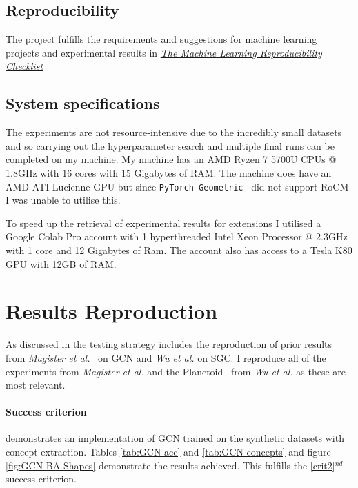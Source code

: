 \subsection{Reproducibility}
The project fulfills the requirements and suggestions for machine learning projects and experimental results in \href{https://www.cs.mcgill.ca/~jpineau/ReproducibilityChecklist-v2.0.pdf}{\textit{The Machine Learning Reproducibility Checklist}}~\cite{pineau2021improving} 

\subsection{System specifications}
The experiments are not resource-intensive due to the incredibly small datasets and so carrying out the hyperparameter search and multiple final runs can be completed on my machine.
My machine has an AMD Ryzen 7 5700U CPUs @ 1.8GHz with 16 cores with 15 Gigabytes of RAM.
The machine does have an AMD ATI Lucienne GPU but since \texttt{PyTorch Geometric}~\cite{paszke2019pytorch} did not support RoCM I was unable to utilise this.

To speed up the retrieval of experimental results for extensions I utilised a Google Colab Pro account with 1 hyperthreaded Intel Xeon Processor @ 2.3GHz with 1 core and 12 Gigabytes of Ram.
The account also has access to a Tesla K80 GPU with 12GB of RAM.

\section{Results Reproduction}
\label{sec:reproduction}

As discussed in  the testing strategy includes the reproduction of prior results from \textit{Magister et al.}~\cite{magister2021gcexplainer} on GCN and \textit{Wu et al.}\cite{wu2019simplifying} on SGC.
I reproduce all of the experiments from \textit{Magister et al.} and the Planetoid~\cite{kipf2016semi} from \textit{Wu et al.} as these are most relevant.

\paragraph{Success criterion}
 demonstrates an implementation of GCN trained on the synthetic datasets with concept extraction.
Tables \ref{tab:GCN-acc} and \ref{tab:GCN-concepts} and figure \ref{fig:GCN-BA-Shapes} demonstrate the results achieved.
This fulfills the \ref{crit2}$^{nd}$ success criterion.

